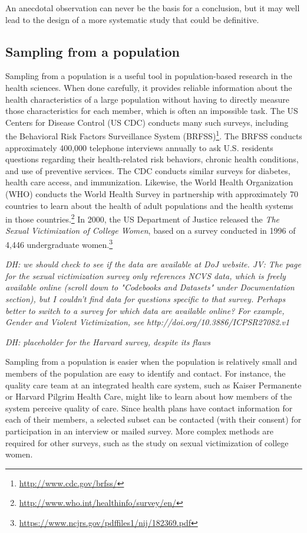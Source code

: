 \begin{doublespace}
An anecdotal observation can never be the basis for a conclusion, but it may well lead to the design of a more systematic study that could be definitive.

\subsection{Sampling from a population}

Sampling from a population is a useful tool in population-based research in the health sciences.  When done carefully, it provides reliable information about the health characteristics of a large population without having to directly measure those characteristics for each member, which is often an impossible task.  The US Centers for Disease Control (US CDC) conducts many such surveys, including the Behavioral Risk Factors Surveillance System (BRFSS)\footnote{\url{ http://www.cdc.gov/brfss/}}.  The BRFSS conducts approximately 400,000 telephone interviews annually to ask U.S. residents questions regarding their health-related risk behaviors, chronic health conditions, and use of preventive services.  The CDC conducts similar surveys for diabetes, health care access, and immunization. Likewise, the World Health Organization (WHO) conducts the World Health Survey in partnership  with approximately 70 countries to learn about the health of adult populations and the health systems in those countries.\footnote{\url{http://www.who.int/healthinfo/survey/en/}}  In 2000, the US Department of Justice released the \textit{The Sexual Victimization of College Women}, based on a survey conducted in 1996 of 4,446 undergraduate women.\footnote{\url{https://www.ncjrs.gov/pdffiles1/nij/182369.pdf}}  

\textit{DH: we should check to see if the data are available at DoJ website. JV: The page for the sexual victimization survey only references NCVS data, which is freely available online (scroll down to "Codebooks and Datasets" under Documentation section), but I couldn't find data for questions specific to that survey. Perhaps better to switch to a survey for which data are available online? For example, Gender and Violent Victimization, see http://doi.org/10.3886/ICPSR27082.v1}

\textit{DH: placeholder for the Harvard survey, despite its flaws}

Sampling from a population is easier when the population is relatively small and members of the population are easy to identify and contact.  For instance, the quality care team at an integrated health care system, such as Kaiser Permanente or Harvard Pilgrim Health Care, might like to learn about how members of the system perceive quality of care.  Since health plans have contact information for each of their members, a selected subset can be contacted (with their consent) for participation in an interview or mailed survey.  More complex methods are required for other surveys, such as the study on sexual victimization of college women. 


\end{doublespace}
